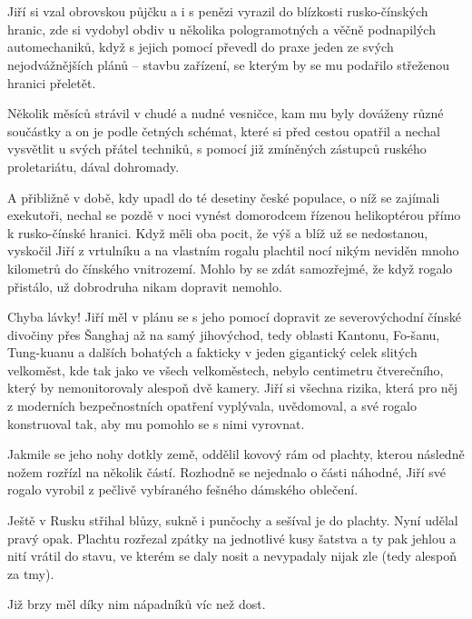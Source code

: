 \chapter{}

Jiří si vzal obrovskou půjčku a i s penězi vyrazil do blízkosti rusko-čínských hranic, zde si vydobyl obdiv u několika pologramotných a věčně podnapilých automechaniků, když s jejich pomocí převedl do praxe jeden ze svých nejodvážnějších plánů – stavbu zařízení, se kterým by se mu podařilo střeženou hranici přeletět.

Několik měsíců strávil v chudé a nudné vesničce, kam mu byly dováženy různé součástky a on je podle četných schémat, které si před cestou opatřil a nechal vysvětlit u svých přátel techniků, s pomocí již zmíněných zástupců ruského proletariátu, dával dohromady.

A přibližně v době, kdy upadl do té desetiny české populace, o níž se zajímali exekutoři, nechal se pozdě v noci vynést domorodcem řízenou helikoptérou přímo k rusko-čínské hranici. Když měli oba pocit, že výš a blíž už se nedostanou, vyskočil Jiří z vrtulníku a na vlastním rogalu plachtil nocí nikým neviděn mnoho kilometrů do čínského vnitrozemí.
Mohlo by se zdát samozřejmé, že když rogalo přistálo, už dobrodruha nikam dopravit nemohlo. 

Chyba lávky! Jiří měl v plánu se s jeho pomocí dopravit ze severovýchodní čínské divočiny přes Šanghaj až na samý jihovýchod, tedy oblasti Kantonu, Fo-šanu, Tung-kuanu a dalších bohatých a fakticky v jeden gigantický celek slitých velkoměst, kde tak jako ve všech velkoměstech, nebylo centimetru čtverečního, který by nemonitorovaly alespoň dvě kamery. Jiří si všechna rizika, která pro něj z moderních bezpečnostních opatření vyplývala, uvědomoval, a své rogalo konstruoval tak, aby mu pomohlo se s nimi vyrovnat. 

Jakmile se jeho nohy dotkly země, oddělil kovový rám od plachty, kterou následně nožem rozřízl na několik částí. Rozhodně se nejednalo o části náhodné, Jiří své rogalo vyrobil z pečlivě vybíraného fešného dámského oblečení.

Ještě v Rusku střihal blůzy, sukně i punčochy a sešíval je do plachty. Nyní udělal pravý opak. Plachtu rozřezal zpátky na jednotlivé kusy šatstva a ty pak jehlou a nití vrátil do stavu, ve kterém se daly nosit a nevypadaly nijak zle (tedy alespoň za tmy). 
 
Již brzy měl díky nim nápadníků víc než dost.
\vspace{0.75cm}

